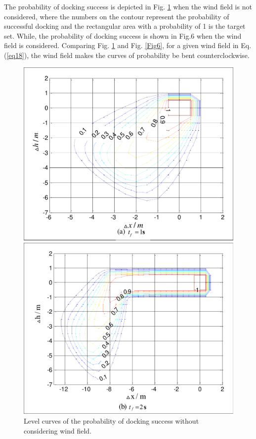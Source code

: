 The probability of docking success is depicted in Fig. \ref{Fig5} when the wind field is not considered, where the numbers on the contour represent the probability of successful docking and the rectangular area with a probability of 1 is the target set. While, the probability of docking success is shown in Fig.6 when the wind field is considered. Comparing Fig. \ref{Fig5} and Fig. \ref{Fig6}, for a given wind field in Eq. (\ref{eq18}), the wind field makes the curves of probability be bent counterclockwise.
\begin{figure}[H]
	\begin{minipage}[t]{0.45\textwidth}
		\centering
		\includegraphics[scale=0.45]{Figures/Figs_Ch13/Fig5_1}		
	\end{minipage}
	\qquad
	\begin{minipage}[t]{0.45\textwidth}
		\centering
		\includegraphics[scale=0.45]{Figures/Figs_Ch13/Fig5_2}
	\end{minipage}
	\caption{Level curves of the probability of docking success without considering wind field.\label{Fig5}}
\end{figure}
